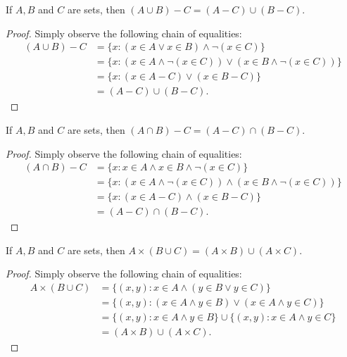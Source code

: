 \documentclass{exam}
\begin{document}
\begin{proposition}{8.14}
    If $A, B$ and $C$ are sets, then $(A\cup B) - C = (A - C)\cup(B - C)$.
\end{proposition}

\begin{proof}
    Simply observe the following chain of equalities:
    \begin{align*}
        (A\cup B)-C &= \{x: (x\in A\lor x\in B)\land\lnot(x\in C)\}\\
        &= \{x:(x\in A\land\lnot(x\in C))\lor(x\in B\land\lnot(x\in C))\}\\
        &= \{x:(x\in A - C)\lor(x\in B - C)\}\\
        &= (A-C)\cup(B-C).
    \end{align*}
\end{proof}

\begin{proposition}{8.15}
    If $A, B$ and $C$ are sets, then $(A\cap B) - C = (A - C)\cap(B - C)$.
\end{proposition}

\begin{proof}
    Simply observe the following chain of equalities:
    \begin{align*}
        (A\cap B)-C &= \{x: x\in A\land x\in B\land\lnot(x\in C)\}\\
        &= \{x:(x\in A\land\lnot(x\in C))\land(x\in B\land\lnot(x\in C))\}\\
        &= \{x:(x\in A - C)\land(x\in B - C)\}\\
        &= (A-C)\cap(B-C).
    \end{align*}
\end{proof}

\begin{proposition}{8.16}
    If $A, B$ and $C$ are sets, then $A\times (B\cup C)=(A\times B)\cup (A\times C)$.
\end{proposition}

\begin{proof}
    Simply observe the following chain of equalities:
    \begin{align*}
        A\times(B\cup C) &=\{(x, y): x\in A\land (y\in B\lor y\in C)\}\\
        &=\{(x, y):(x\in A\land y\in B) \lor(x\in A\land y\in C)\}\\
        &=\{(x, y):x\in A\land y\in B\}\cup\{(x, y):x\in A\land y\in C\}\\
        &=(A\times B)\cup(A\times C).
    \end{align*}
\end{proof}
\end{document}

